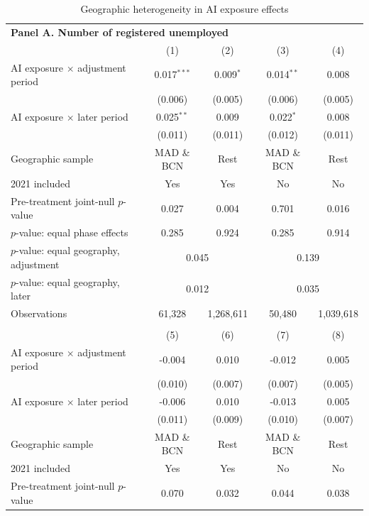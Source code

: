 \begin{table}[H]
\centering
\caption{Geographic heterogeneity in AI exposure effects}
\label{tab:v1_main_provinces}
\begin{threeparttable}
\small
\setlength{\tabcolsep}{5pt}
\begin{tabular}{@{}lcccc@{}}
\toprule
\multicolumn{5}{l}{\textbf{Panel A. Number of registered unemployed}} \\
 & (1) & (2) & (3) & (4) \\
\midrule
AI exposure $\times$ adjustment period & 0.017$^{***}$ & 0.009$^{*}$ & 0.014$^{**}$ & 0.008 \\
 & (0.006) & (0.005) & (0.006) & (0.005) \\
AI exposure $\times$ later period & 0.025$^{**}$ & 0.009 & 0.022$^{*}$ & 0.008 \\
 & (0.011) & (0.011) & (0.012) & (0.011) \\
\midrule
Geographic sample & MAD \& BCN & Rest & MAD \& BCN & Rest \\
2021 included & Yes & Yes & No & No \\
Pre-treatment joint-null $p$-value & 0.027 & 0.004 & 0.701 & 0.016 \\
$p$-value: equal phase effects & 0.285 & 0.924 & 0.285 & 0.914 \\
$p$-value: equal geography, adjustment & \multicolumn{2}{c}{0.045} & \multicolumn{2}{c}{0.139} \\
$p$-value: equal geography, later & \multicolumn{2}{c}{0.012} & \multicolumn{2}{c}{0.035} \\
Observations & 61,328 & 1,268,611 & 50,480 & 1,039,618 \\
\addlinespace[6pt]
\midrule
\multicolumn{5}{l}{\textbf{Panel B. Number of new contracts}} \\
 & (5) & (6) & (7) & (8) \\
\midrule
AI exposure $\times$ adjustment period & -0.004 & 0.010 & -0.012 & 0.005 \\
 & (0.010) & (0.007) & (0.007) & (0.005) \\
AI exposure $\times$ later period & -0.006 & 0.010 & -0.013 & 0.005 \\
 & (0.011) & (0.009) & (0.010) & (0.007) \\
\midrule
Geographic sample & MAD \& BCN & Rest & MAD \& BCN & Rest \\
2021 included & Yes & Yes & No & No \\
Pre-treatment joint-null $p$-value & 0.070 & 0.032 & 0.044 & 0.038 \\

\end{tabular}
\end{threeparttable}
\end{table}
